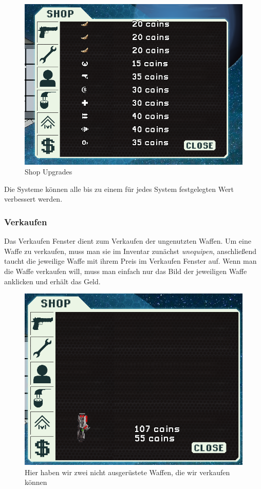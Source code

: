 \documentclass[fontsize=12pt,paper=a4,twoside]{scrartcl}
\begin{document}
\begin{figure}[H]
\centering
\includegraphics[width=1\linewidth]{DasSpiel/Shop/upgrades.png}
\caption{Shop Upgrades}
\end{figure}

Die Systeme können alle bis zu einem für jedes System festgelegten Wert verbessert werden. 

\subsubsection{Verkaufen}

Das Verkaufen Fenster dient zum Verkaufen der ungenutzten Waffen. Um eine Waffe zu verkaufen, muss man sie im Inventar zunächst \textit{unequipen}, anschließend taucht die jeweilige Waffe mit ihrem Preis im Verkaufen Fenster auf. Wenn man die Waffe verkaufen will, muss man einfach nur das Bild der jeweiligen Waffe anklicken und erhält das Geld. 

\begin{figure}[H]
\centering
\includegraphics[width=1\linewidth]{DasSpiel/Shop/sell.png}
\caption{Hier haben wir zwei nicht ausgerüstete Waffen, die wir verkaufen können}
\end{figure}
\end{document}
